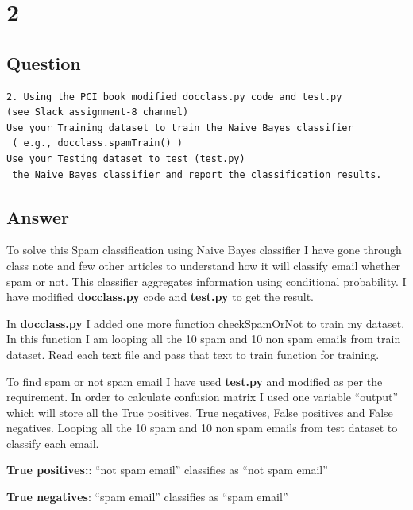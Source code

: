 \documentclass[letterpaper,11pt]{article}
\begin{document}
\clearpage


\section*{2}

\subsection*{Question}

\begin{verbatim}
2. Using the PCI book modified docclass.py code and test.py 
(see Slack assignment-8 channel)
Use your Training dataset to train the Naive Bayes classifier
 ( e.g., docclass.spamTrain() )
Use your Testing dataset to test (test.py)
 the Naive Bayes classifier and report the classification results.
\end{verbatim}

\subsection*{Answer}

To solve this Spam classification using Naive Bayes classifier I have gone through class note and  few other articles to understand how it will classify email  whether  spam or not. This classifier aggregates information using conditional probability. I have modified \textbf{docclass.py} code and\textbf{ test.py} to get the result.

In \textbf{docclass.py}  I added one more function checkSpamOrNot to train my dataset. In this function I am looping all the 10 spam and 10 non spam emails from train dataset. Read each text file and pass that text to train function for training. 

To find spam or not spam email I have used \textbf{test.py} and modified as per the requirement. In order to calculate confusion matrix I used one variable “output” which will store all the True positives, True negatives, False positives and False negatives. Looping all the 10 spam and 10 non spam emails from test dataset to classify each email.



\textbf{True positives:}: “not spam email” classifies as “not spam email”

\textbf{True negatives}: “spam email” classifies as “spam email”
\end{document}
